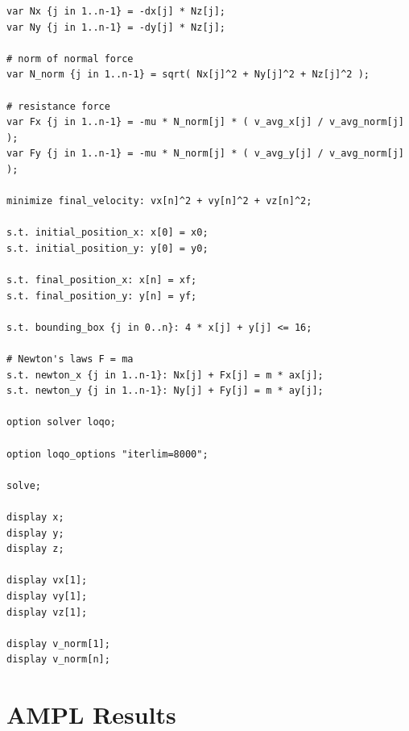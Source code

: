 \documentclass{article}
\begin{document}
\begin{verbatim}
var Nx {j in 1..n-1} = -dx[j] * Nz[j];
var Ny {j in 1..n-1} = -dy[j] * Nz[j];

# norm of normal force
var N_norm {j in 1..n-1} = sqrt( Nx[j]^2 + Ny[j]^2 + Nz[j]^2 );

# resistance force
var Fx {j in 1..n-1} = -mu * N_norm[j] * ( v_avg_x[j] / v_avg_norm[j] );
var Fy {j in 1..n-1} = -mu * N_norm[j] * ( v_avg_y[j] / v_avg_norm[j] );

minimize final_velocity: vx[n]^2 + vy[n]^2 + vz[n]^2;

s.t. initial_position_x: x[0] = x0;
s.t. initial_position_y: y[0] = y0;

s.t. final_position_x: x[n] = xf;
s.t. final_position_y: y[n] = yf;

s.t. bounding_box {j in 0..n}: 4 * x[j] + y[j] <= 16;

# Newton's laws F = ma
s.t. newton_x {j in 1..n-1}: Nx[j] + Fx[j] = m * ax[j];
s.t. newton_y {j in 1..n-1}: Ny[j] + Fy[j] = m * ay[j];

option solver loqo;

option loqo_options "iterlim=8000";

solve;

display x;
display y;
display z;

display vx[1];
display vy[1];
display vz[1];

display v_norm[1];
display v_norm[n];

\end{verbatim}

\section{AMPL Results}\label{AMPL Results}
\end{document}
